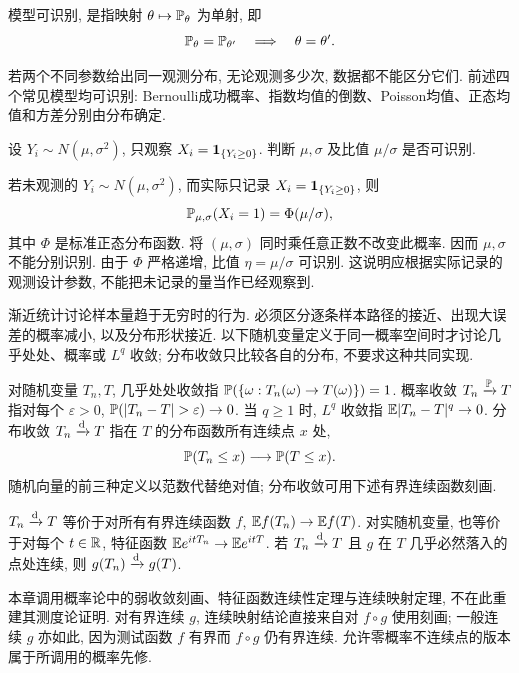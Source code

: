 \begin{definition}[可识别性]
模型可识别, 是指映射 $\theta\mapsto\mathbb P_\theta$ 为单射, 即
\[
 \mathbb P_\theta=\mathbb P_{\theta'}\quad\Longrightarrow\quad\theta=\theta'.
\]
\end{definition}
若两个不同参数给出同一观测分布, 无论观测多少次, 数据都不能区分它们. 前述四个常见模型均可识别: Bernoulli成功概率、指数均值的倒数、Poisson均值、正态均值和方差分别由分布确定.

\begin{example}
设 $Y_i\sim N(\mu,\sigma^2)$, 只观察 $X_i=\mathbf 1_{\{Y_i\ge0\}}$. 判断 $\mu,\sigma$ 及比值 $\mu/\sigma$ 是否可识别.
\end{example}
\begin{solution}
若未观测的 $Y_i\sim N(\mu,\sigma^2)$, 而实际只记录 $X_i=\mathbf 1_{\{Y_i\ge0\}}$, 则
\[
 \mathbb P_{\mu,\sigma}(X_i=1)=\Phi(\mu/\sigma),
\]
其中 $\Phi$ 是标准正态分布函数. 将 $(\mu,\sigma)$ 同时乘任意正数不改变此概率. 因而 $\mu,\sigma$ 不能分别识别. 由于 $\Phi$ 严格递增, 比值 $\eta=\mu/\sigma$ 可识别. 这说明应根据实际记录的观测设计参数, 不能把未记录的量当作已经观察到.
\end{solution}

渐近统计讨论样本量趋于无穷时的行为. 必须区分逐条样本路径的接近、出现大误差的概率减小, 以及分布形状接近. 以下随机变量定义于同一概率空间时才讨论几乎处处、概率或 $L^q$ 收敛; 分布收敛只比较各自的分布, 不要求这种共同实现.

\begin{definition}[四种收敛]
对随机变量 $T_n,T$, 几乎处处收敛指 $\mathbb P(\{\omega:T_n(\omega)\to T(\omega)\})=1$. 概率收敛 $T_n\xrightarrow{\mathbb P} T$ 指对每个 $\varepsilon>0$, $\PP(|T_n-T|>\varepsilon)\to0$. 当 $q\ge1$ 时, $L^q$ 收敛指 $\mathbb E|T_n-T|^q\to0$. 分布收敛 $T_n\xrightarrow{\mathrm d} T$ 指在 $T$ 的分布函数所有连续点 $x$ 处,
\[
 \mathbb P(T_n\le x)\longrightarrow\mathbb P(T\le x).
\]
随机向量的前三种定义以范数代替绝对值; 分布收敛可用下述有界连续函数刻画.
\end{definition}

\begin{theorem}[分布收敛的概率先修]
$T_n\xrightarrow{\mathrm d} T$ 等价于对所有有界连续函数 $f$, $\mathbb E f(T_n)\to\mathbb E f(T)$. 对实随机变量, 也等价于对每个 $t\in\mathbb R$, 特征函数 $\mathbb E e^{itT_n}\to\mathbb E e^{itT}$. 若 $T_n\xrightarrow{\mathrm d} T$ 且 $g$ 在 $T$ 几乎必然落入的点处连续, 则 $g(T_n)\xrightarrow{\mathrm d} g(T)$.
\end{theorem}
本章调用概率论中的弱收敛刻画、特征函数连续性定理与连续映射定理, 不在此重建其测度论证明. 对有界连续 $g$, 连续映射结论直接来自对 $f\circ g$ 使用刻画; 一般连续 $g$ 亦如此, 因为测试函数 $f$ 有界而 $f\circ g$ 仍有界连续. 允许零概率不连续点的版本属于所调用的概率先修.

